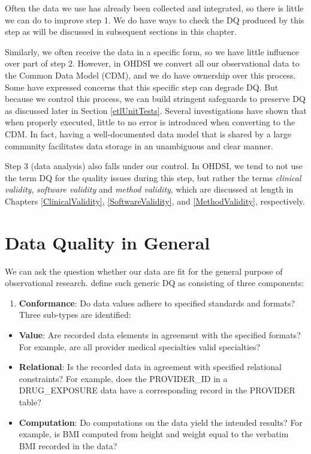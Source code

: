 \documentclass[11pt]{book}
\providecommand{\tightlist}{%
  \setlength{\itemsep}{0pt}\setlength{\parskip}{0pt}}
\theoremstyle{definition}
\theoremstyle{definition}
\theoremstyle{definition}
\theoremstyle{remark}
\begin{document}
Often the data we use has already been collected and integrated, so
there is little we can do to improve step 1. We do have ways to check
the DQ produced by this step as will be discussed in subsequent sections
in this chapter.

Similarly, we often receive the data in a specific form, so we have
little influence over part of step 2. However, in OHDSI we convert all
our observational data to the Common Data Model (CDM), and we do have
ownership over this process. Some have expressed concerns that this
specific step can degrade DQ. But because we control this process, we
can build stringent safeguards to preserve DQ as discussed later in
Section \ref{etlUnitTests}. Several investigations
\citep{defalco_2013, makadia_2014, matcho_2014, voss_2015, voss_2015b, hripcsak_2018}
have shown that when properly executed, little to no error is introduced
when converting to the CDM. In fact, having a well-documented data model
that is shared by a large community facilitates data storage in an
unambiguous and clear manner.

Step 3 (data analysis) also falls under our control. In OHDSI, we tend
to not use the term DQ for the quality issues during this step, but
rather the terms \emph{clinical validity}, \emph{software validity} and
\emph{method validity}, which are discussed at length in Chapters
\ref{ClinicalValidity}, \ref{SoftwareValidity}, and
\ref{MethodValidity}, respectively.

\section{Data Quality in General}\label{data-quality-in-general}

We can ask the question whether our data are fit for the general purpose
of observational research. \citet{kahn_harmonized_2016} define such
generic DQ as consisting of three components:

\begin{enumerate}
\def\labelenumi{\arabic{enumi}.}
\tightlist
\item
  \textbf{Conformance}: Do data values adhere to specified standards and
  formats? Three sub-types are identified:
\end{enumerate}

\begin{itemize}
\tightlist
\item
  \textbf{Value}: Are recorded data elements in agreement with the
  specified formats? For example, are all provider medical specialties
  valid specialties?
\item
  \textbf{Relational}: Is the recorded data in agreement with specified
  relational constraints? For example, does the PROVIDER\_ID in a
  DRUG\_EXPOSURE data have a corresponding record in the PROVIDER table?
\item
  \textbf{Computation}: Do computations on the data yield the intended
  results? For example, is BMI computed from height and weight equal to
  the verbatim BMI recorded in the data?
\end{itemize}
\end{document}
